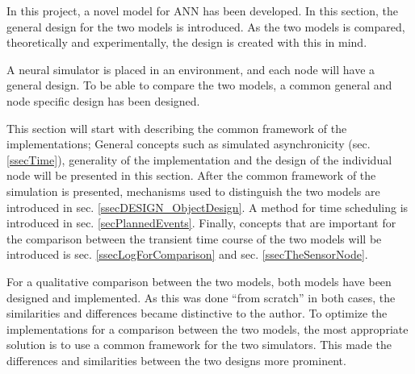 	In this project, a novel model for ANN has been developed.  %
	In this section, the general design for the two models is introduced.
	As the two models is compared, theoretically and experimentally, the design is created with this in mind.

	A neural simulator is placed in an environment, and each node will have a general design.
	To be able to compare the two models, a common general and node specific design has been designed.

	This section will start with describing the common framework of the implementations; 
		General concepts such as simulated asynchronicity (sec.\ref{ssecTime}), generality of the implementation and the design of the individual node will be presented in this section. 
	After the common framework of the simulation is presented,
		 mechanisms used to distinguish the two models are introduced in sec. \ref{ssecDESIGN_ObjectDesign}.
	A method for time scheduling is introduced in sec. \ref{secPlannedEvents}.
	Finally, concepts that are important for the comparison between the transient time course of the two models will be introduced is sec. \ref{ssecLogForComparison} and sec. \ref{ssecTheSensorNode}.


	For a qualitative comparison between the two models, both models have been designed and implemented. 
	As this was done ``from scratch'' in both cases, the similarities and differences became distinctive to the author. 
	To optimize the implementations for a comparison between the two models, the most appropriate solution is to use a common framework for the two simulators.
	This made the differences and similarities between the two designs more prominent.





	

